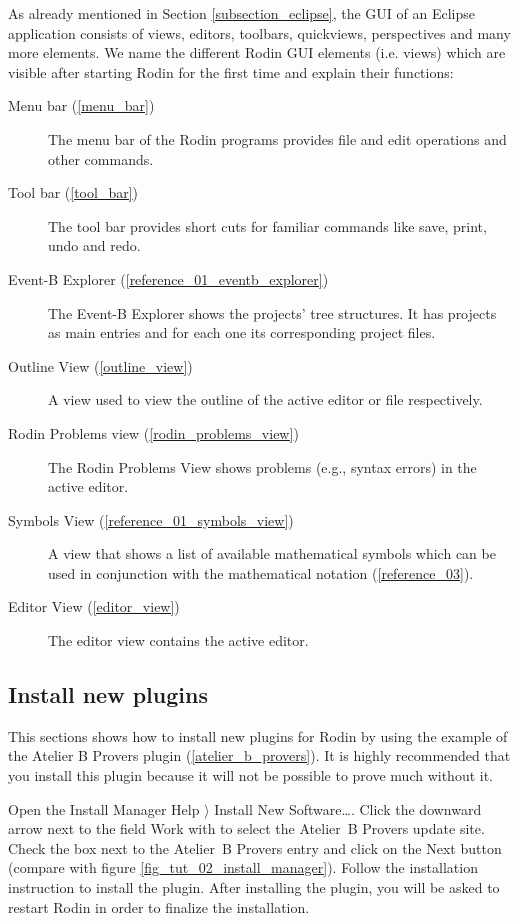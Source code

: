 As already mentioned in Section \ref{subsection_eclipse}, the GUI of an Eclipse application consists of views, editors, toolbars, quickviews, perspectives and many more elements. We name the different Rodin GUI elements (i.e. views) which are visible after starting Rodin for the first time and explain their functions:

\begin{description}
	\item[Menu bar (\ref{menu_bar})] The menu bar of the Rodin programs provides file and edit operations and other commands.
	\item[Tool bar (\ref{tool_bar})] The tool bar provides short cuts for familiar commands like save, print, undo and redo.
	\item[Event-B Explorer (\ref{reference_01_eventb_explorer})] The Event-B Explorer shows the projects' tree structures. It has projects as main entries and for each one its corresponding project files.
	\item[Outline View (\ref{outline_view})] A view used to view the outline of the active editor or file respectively.
	\item[Rodin Problems view (\ref{rodin_problems_view})] The Rodin Problems View shows problems (e.g., syntax errors) in the active editor.
	\item[Symbols View (\ref{reference_01_symbols_view})] A view that shows a list of available mathematical symbols which can be used in conjunction with the mathematical notation (\ref{reference_03}).
	\item[Editor View (\ref{editor_view})] The editor view contains the active editor.
\end{description}

\subsection{Install new plugins}

This sections shows how to install new plugins for Rodin by using the example of the Atelier B Provers plugin (\ref{atelier_b_provers}). It is highly recommended that you install this plugin because it will not be possible to prove much without it.

Open the Install Manager \textsf{Help $\rangle$ Install New Software\ldots}. Click the downward arrow next to the field \textsf{Work with} to select the Atelier~B Provers update site. Check the box next to the Atelier~B Provers entry and click on the \textsf{Next} button (compare with figure \ref{fig_tut_02_install_manager}). Follow the installation instruction to install the plugin. After installing the plugin, you will be asked to restart Rodin in order to finalize the installation.

